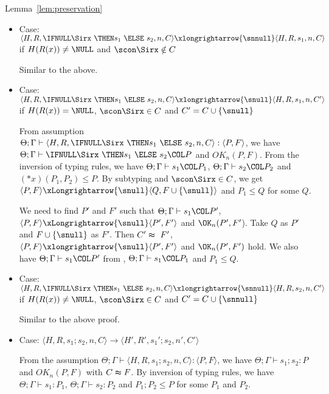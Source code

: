 \begin{pfof}{Lemma~\ref{lem:preservation}}
\begin{itemize}
\item Case: \(\langle H, R, \IFNULL \Sirx \ \THEN s_{1} \ \ELSE
  \ s_{2}, n, C\rangle \xlongrightarrow{\snnull} \langle H, R, s_{1}, n, C \rangle\)
  if \(H(R(x)) \neq \NULL\) and \(\scon\Sirx \notin C\)

    Similar to the above.
  
\item Case: \(\langle H, R, \IFNULL \Sirx \ \THEN s_{1} \ \ELSE
  \ s_{2}, n, C\rangle \xlongrightarrow{\snull} \langle H, R, s_{1}, n, C'
  \rangle\) if \(H(R(x)) = \NULL\), \(\scon\Sirx \in C\) and \(C' = C
  \cup \{\snull\}\)

  From assumption \( \Theta; \Gamma \vdash \langle H, R, \IFNULL\Sirx
  \ \THEN s_{1} \ \ELSE \ s_{2}, n, C \rangle : \langle P, F
  \rangle\), we have \(\Theta; \Gamma \vdash \IFNULL\Sirx \ \THEN
  s_{1} \ \ELSE \ s_{2} \COL P \) and \(OK_n(P, F)\). From the
  inversion of typing rules, we have \(\Theta; \Gamma \vdash s_{1}
  \COL P_1\), \(\Theta; \Gamma \vdash s_{2} \COL P_2\) and \((*x)(P_1,
  P_2) \le P\). By subtyping and \(\scon\Sirx \in C\), we get
  \(\langle P, F \rangle \xLongrightarrow{\snull} \langle Q, F\cup \{\snull\}
  \rangle \) and \(P_1 \le Q\) for some \(Q\).
  
  We need to find \(P'\) and \(F'\) such that \(\Theta;\Gamma \vdash
  s_1 \COL P'\), \( \langle P, F \rangle \xLongrightarrow{\snull}
  \langle P', F' \rangle\) and \(\OK_n(P', F'\)). Take \(Q\) as \(P'\)
  and \(F\cup \{\snull\}\) as \(F'\). Then \(C' \thickapprox\ F'\), \(
  \langle P,F \rangle \xlongrightarrow{\snull} \langle P', F' \rangle\) and
  \(\OK_n(P', F')\) hold.  We also have \(\Theta; \Gamma \vdash s_1
  \COL P'\) from , \(\Theta; \Gamma \vdash s_1 \COL P_1\)
  and \( P_1 \le Q\).

\item Case: \(\langle H, R, \IFNULL \Sirx \ \THEN s_{1} \ \ELSE
    \ s_{2}, n, C\rangle \xlongrightarrow{\snnull} \langle H, R, s_{2}, n, C'
    \rangle\) if \(H(R(x)) \neq \NULL\), \(\scon\Sirx \in C\) and \(C'
    = C \cup \{\snnull\}\)

  Similar to the above proof.

\item Case: \(\langle H, R, s_1;s_2, n, C\rangle \rightarrow \langle
  H', R', s_1';s_2, n', C' \rangle \)

  From the assumption \(\Theta; \Gamma \vdash \langle H, R, s_1;s_2,
  n, C \rangle : \langle P, F \rangle\), we have \(\Theta; \Gamma
  \vdash s_1;s_2 : P\) and \(OK_n(P, F)\) with \(C \thickapprox
  F\). By inversion of typing rules, we have \(\Theta; \Gamma \vdash
  s_1: P_1\), \(\Theta; \Gamma \vdash s_2: P_2\) and \(P_1;P_2 \le P\)
  for some \(P_1\) and \(P_2\).


\end{itemize}
\end{pfof}
